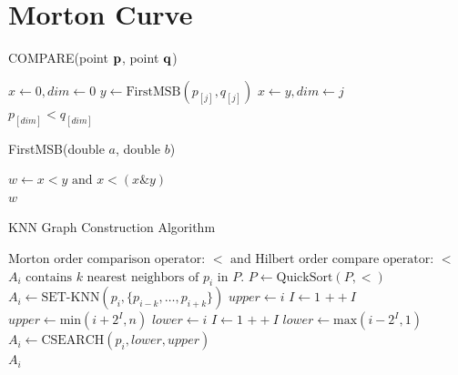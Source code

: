 \documentclass[10pt]{article}
\begin{document}
\section{Morton Curve}

\begin{algorithm}
  \caption{COMPARE(point ${\bf p}$, point ${\bf q}$)}
  \label{compare}
  \begin{algorithmic}[1]
    \State $x \leftarrow 0, dim \leftarrow 0$
    \State $y \leftarrow \text{FirstMSB}(p_{[j]}, q_{[j]})$
    \State $x \leftarrow y, dim \leftarrow j$
    \EndIf 
    \EndFor \\
    \Return $p_{[dim]} < q_{[dim]}$
  \end{algorithmic}
\end{algorithm}

\begin{algorithm}
  \caption{FirstMSB(double $a$, double $b$)}
  \label{first-msb}
  \begin{algorithmic}[1]
    \State $w \leftarrow x < y \text{ and } x < (x \mathrel{\&} y)$ \\
    \Return $w$
  \end{algorithmic}
\end{algorithm}

\begin{algorithm}
  \caption{KNN Graph Construction Algorithm}
  \label{knn-graph-alg}
  \begin{algorithmic}[1]
    \Require $\text{Morton order comparison operator: } < 
    \text{ and Hilbert order compare operator: } <$
    \Ensure $A_i \text{ contains } k \text{ nearest neighbors of } p_i \text{ in } P \text{.}$
    \State $P \leftarrow \text{QuickSort}(P, <)$
    \State $A_i \leftarrow \text{SET-KNN}(p_i, \{p_{i-k}, \dots, p_{i+k} \})$
    \State $upper \leftarrow i$
    \Else
    \State $I \leftarrow 1$
    \State $++I$
    \EndWhile
    \State $upper \leftarrow \text{min}(i+2^I, n)$
    \EndIf
    \State $lower \leftarrow i$
    \Else
    \State $I \leftarrow 1$
    \State $++I$
    \EndWhile
    \State $lower \leftarrow \text{max}(i-2^I, 1)$
    \EndIf
    \State $A_i \leftarrow \text{CSEARCH}(p_i, lower, upper)$
    \EndIf
    \EndFor \\
    \Return $A_i$
  \end{algorithmic}
\end{algorithm}
\end{document}
